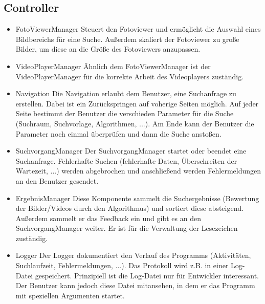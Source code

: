 \subsection{Controller}
\begin{itemize}
\item FotoViewerManager \newline
Steuert den Fotoviewer und ermöglicht die Auswahl eines Bildbereichs für eine Suche. Außerdem skaliert der Fotoviewer zu große Bilder, um diese an die Größe des Fotoviewers anzupassen.

\item VideoPlayerManager \newline
Ähnlich dem FotoViewerManager ist der VideoPlayerManager für die korrekte Arbeit des Videoplayers zuständig.

\item Navigation \newline
Die Navigation erlaubt dem Benutzer, eine Suchanfrage zu erstellen. Dabei ist ein Zurückspringen auf voherige Seiten möglich. Auf jeder Seite bestimmt der Benutzer die verschieden Parameter für die Suche (Suchraum, Suchvorlage, Algorithmen, ...). Am Ende kann der Benutzer die Parameter noch einmal überprüfen und dann die Suche anstoßen.

\item SuchvorgangManager \newline
Der SuchvorgangManager startet oder beendet eine Suchanfrage. Fehlerhafte Suchen (fehlerhafte Daten, Überschreiten der Wartezeit, ...) werden abgebrochen und anschließend werden Fehlermeldungen an den Benutzer gesendet.

\item ErgebnisManager \newline
Diese Komponente sammelt die Suchergebnisse (Bewertung der Bilder/Videos durch den Algorithmus) und sortiert diese absteigend. Außerdem sammelt er das \gls{Feedback} ein und gibt es an den SuchvorgangManager weiter. Er ist für die Verwaltung der \gls{Lesezeichen} zuständig.

\item Logger \newline
Der Logger dokumentiert den Verlauf des Programms (Aktivitäten, Suchlaufzeit, Fehlermeldungen, ...). Das Protokoll wird z.B. in einer Log-Datei gespeichert. Prinzipiell ist die Log-Datei nur für Entwickler interessant. Der Benutzer kann jedoch diese Datei mitansehen, in dem er das Programm mit speziellen Argumenten startet.
\end{itemize}
\pagebreak
